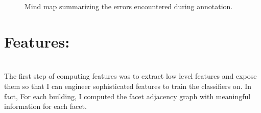 \documentclass[a4paper, 11pt]{article}
\begin{document}
	\begin{landscape}
		\begin{figure}
			\begin{center}
				
				\caption{\label{fig::mindmap_errors} Mind map summarizing the errors encountered during annotation.}
			\end{center}
		\end{figure}
	\end{landscape}

	\section{Features:}
~\\

	The first step of computing features was to extract low level features and
	expose them so that I can engineer sophisticated features to train the
	classifiers on. In fact, For each building, I computed the facet adjacency
	graph with meaningful information for each facet.
\end{document}
